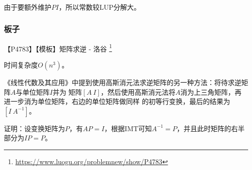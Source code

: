 由于要额外维护$PI$，所以常数较LUP分解大。

\subsubsection{板子}

【P4783】【模板】矩阵求逆 - 洛谷
\footnote{\url{https://www.luogu.org/problemnew/show/P4783}}

时间复杂度$O(n^3)$。

《线性代数及其应用》中提到使用高斯消元法求逆矩阵的另一种方法：将待求逆矩阵$A$与单位矩阵$I$并为
矩阵$[A~I]$，然后使用高斯消元法将$A$消为上三角矩阵，再进一步消为单位矩阵，右边的单位矩阵做同样
的初等行变换，最后的结果为$[I~A^{-1}]$。

证明：设变换矩阵为$P$，有$AP=I$，根据IMT可知$A^{-1}=P$，并且此时矩阵的右半部分为$IP=P$。
